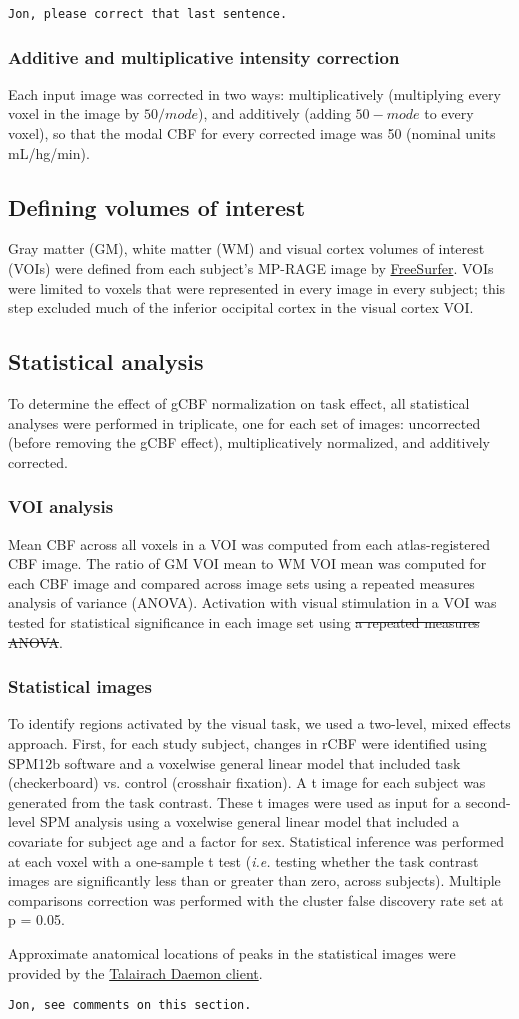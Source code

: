 \verb|Jon, please correct that last sentence.|
\subsubsection{Additive and multiplicative intensity correction}
Each input image was corrected in two ways: multiplicatively (multiplying every voxel in the image by $50/mode$), and additively (adding $50-mode$ to every voxel), so that the modal CBF for every corrected image was 50 (nominal units mL/hg/min).

\subsection{Defining volumes of interest}
Gray matter (GM), white matter (WM) and visual cortex volumes of interest (VOIs) were defined from each subject's MP-RAGE image by \href{https://surfer.nmr.mgh.harvard.edu/}{FreeSurfer}.\cite{Desikan2006968} VOIs were limited to voxels that were represented in every image in every subject; this step excluded much of the inferior occipital cortex in the visual cortex VOI.\cite{Black_2010} 

\subsection{Statistical analysis}
To determine the effect of gCBF normalization on task effect, all statistical analyses were performed in triplicate, one for each set of images: uncorrected (before removing the gCBF effect), multiplicatively normalized, and additively corrected.

\subsubsection{VOI analysis}
Mean CBF across all voxels in a VOI was computed from each atlas-registered CBF image. The ratio of GM VOI mean to WM VOI mean was computed for each CBF image and compared across image sets using a repeated measures analysis of variance (ANOVA). Activation with visual stimulation in a VOI was tested for statistical significance in each image set using \sout{a repeated measures ANOVA}. 

\subsubsection{Statistical images}
To identify regions activated by the visual task, we used a two-level, mixed effects approach.  First, for each study subject, changes in rCBF were identified using SPM12b software and a voxelwise general linear model that included task (checkerboard) vs. control (crosshair fixation). A t image for each subject was generated from the task contrast. These t images were used as input for a second-level SPM analysis using a voxelwise general linear model that included a covariate for subject age and a factor for sex. Statistical inference was performed at each voxel with a one-sample t test (\textit{i.e.} testing whether the task contrast images are significantly less than or greater than zero, across subjects). Multiple comparisons correction was performed with the cluster false discovery rate set at p = 0.05. 

Approximate anatomical locations of peaks in the statistical images were provided by the \href{http://www.talairach.org}{Talairach Daemon client}.\cite{20408222,10912591}

\verb|Jon, see comments on this section.|